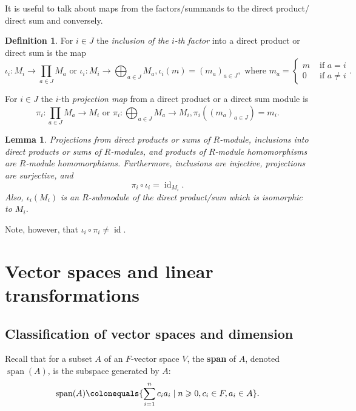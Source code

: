 \documentclass[12pt]{report}
\newtheorem{lemma}[theorem]{Lemma}
\numberwithin{equation}{section}
\numberwithin{theorem}{chapter}
\theoremstyle{definition}
\newtheorem{definition}[theorem]{Definition}
\newtheorem*{basic properties}{Basic Properties}
\newtheorem*{Important Remark}{Important Remark}
\newcommand{\df}[1]{{\bf #1}\index{#1}}
\DeclareMathOperator{\id}{id}
\DeclareMathOperator{\Span}{span}
\begin{document}
It is useful to talk about maps from the factors/summands to the direct product/ direct sum and conversely.

\begin{definition}
For $i\in J$ the {\em inclusion of the $i$-th factor} into a direct product or direct sum is the map
$$\iota_i\!: M_i \to \prod_{a \in J} M_a \text{ or } \iota_i\!: M_i \to \bigoplus_{a \in J} M_a, \iota_i(m)=(m_a)_{a \in J}, \text{ where } m_a=\begin{cases} m & \text{ if } a = i \\ 0 & \text{ if } a \neq i \end{cases}.$$


\noindent For $i\in J$ the $i$-th {\em projection map} from a direct product or a direct sum module is 
$$\pi_i\!: \prod_{a \in J} M_a \to M_i \text{ or } \pi_i:\bigoplus_{a \in J} M_a \to M_i, \pi_i \left((m_a)_{a \in J}\right)=m_i.$$
\end{definition}


\begin{lemma}
Projections from direct products or sums of $R$-module, inclusions into direct products or sums of $R$-modules, and products of $R$-module homomorphisms are $R$-module homomorphisms. Furthermore, inclusions are injective, projections are surjective, and 
$$\pi_i\circ \iota_i=\id_{M_i}.$$
Also, $\iota_i(M_i)$ is an $R$-submodule of the direct product/sum which is isomorphic to $M_i$.
\end{lemma}


Note, however, that $\iota_i\circ\pi_i\neq \id$.





\chapter{Vector spaces and linear transformations}

\section{Classification of vector spaces and dimension}


Recall that for a subset $A$ of an $F$-vector space $V$, the \df{span} of $A$, denoted $\Span(A)$, is the subspace generated by $A$:
$$\Span(A) \colonequals \{\sum_{i=1}^n c_ia_i \mid n \geqslant 0, c_i\in F, a_i \in A \}.$$

\end{document}
